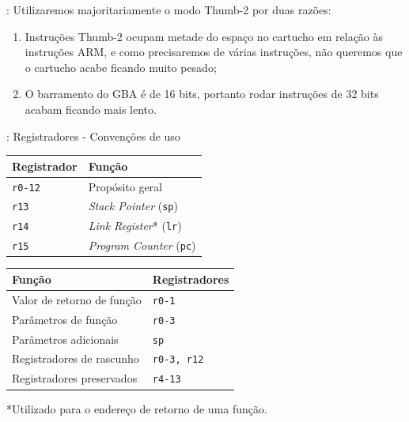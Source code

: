 \documentclass{beamer}
\begin{document}
\begin{darkframes}
\begin{frame}{\secname: \subsecname}
        Utilizaremos majoritariamente o modo Thumb-2 por duas razões:
        \begin{enumerate}
            \item Instruções Thumb-2 ocupam metade do espaço no cartucho em
                relação às instruções ARM, e como precisaremos de várias
                instruções, não queremos que o cartucho acabe ficando muito
                pesado;
            \item O barramento do GBA é de 16 bits, portanto rodar instruções
                de 32 bits acabam ficando mais lento.
        \end{enumerate}
    \end{frame}

    \begin{frame}{\secname: Registradores - Convenções de uso}
        \begin{center}
            \begin{tabular}{|l|l|}
                \hline
                Registrador & Função \\\hline
                \texttt{r0-12} & Propósito geral \\
                \texttt{r13} & \textit{Stack Pointer} (\texttt{sp}) \\
                \texttt{r14} & \textit{Link Register}* (\texttt{lr}) \\
                \texttt{r15} & \textit{Program Counter} (\texttt{pc}) \\
                \hline
            \end{tabular}


            \begin{tabular}{|l|l|}
                \hline
                Função & Registradores \\\hline
                Valor de retorno de função & \texttt{r0-1} \\
                Parâmetros de função & \texttt{r0-3} \\
                Parâmetros adicionais & \texttt{sp} \\
                Registradores de rascunho & \texttt{r0-3, r12} \\
                Registradores preservados & \texttt{r4-13} \\
                \hline
            \end{tabular}
        \end{center}

        *Utilizado para o endereço de retorno de uma função.
    \end{frame}


\end{darkframes}
\end{document}
